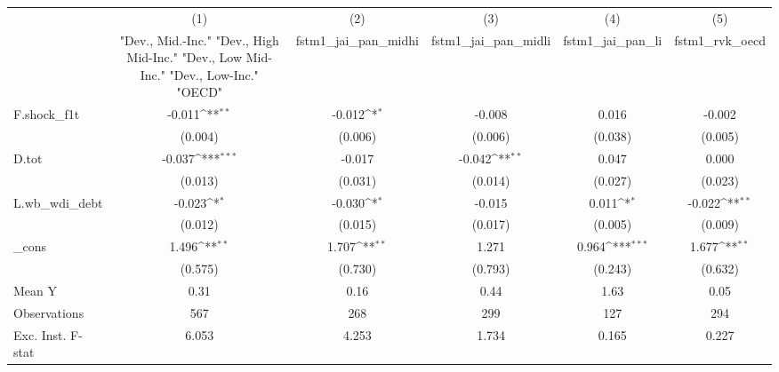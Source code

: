 {
\def\sym#1{\ifmmode^{#1}\else\(^{#1}\)\fi}
\begin{tabular}{l*{5}{c}}
\toprule
            &\multicolumn{1}{c}{(1)}&\multicolumn{1}{c}{(2)}&\multicolumn{1}{c}{(3)}&\multicolumn{1}{c}{(4)}&\multicolumn{1}{c}{(5)}\\
            &\multicolumn{1}{c}{ "Dev., Mid.-Inc." "Dev., High Mid-Inc." "Dev., Low Mid-Inc." "Dev., Low-Inc." "OECD" }&\multicolumn{1}{c}{fstm1\_jai\_pan\_midhi}&\multicolumn{1}{c}{fstm1\_jai\_pan\_midli}&\multicolumn{1}{c}{fstm1\_jai\_pan\_li}&\multicolumn{1}{c}{fstm1\_rvk\_oecd}\\
\midrule
F.shock\_f1t &      -0.011\sym{**} &      -0.012\sym{*}  &      -0.008         &       0.016         &      -0.002         \\
            &     (0.004)         &     (0.006)         &     (0.006)         &     (0.038)         &     (0.005)         \\
\addlinespace
D.tot       &      -0.037\sym{***}&      -0.017         &      -0.042\sym{**} &       0.047         &       0.000         \\
            &     (0.013)         &     (0.031)         &     (0.014)         &     (0.027)         &     (0.023)         \\
\addlinespace
L.wb\_wdi\_debt&      -0.023\sym{*}  &      -0.030\sym{*}  &      -0.015         &       0.011\sym{*}  &      -0.022\sym{**} \\
            &     (0.012)         &     (0.015)         &     (0.017)         &     (0.005)         &     (0.009)         \\
\addlinespace
\_cons      &       1.496\sym{**} &       1.707\sym{**} &       1.271         &       0.964\sym{***}&       1.677\sym{**} \\
            &     (0.575)         &     (0.730)         &     (0.793)         &     (0.243)         &     (0.632)         \\
\midrule
Mean Y      &        0.31         &        0.16         &        0.44         &        1.63         &        0.05         \\
Observations&         567         &         268         &         299         &         127         &         294         \\
Exc. Inst. F-stat&       6.053         &       4.253         &       1.734         &       0.165         &       0.227         \\
\bottomrule
\end{tabular}
}
